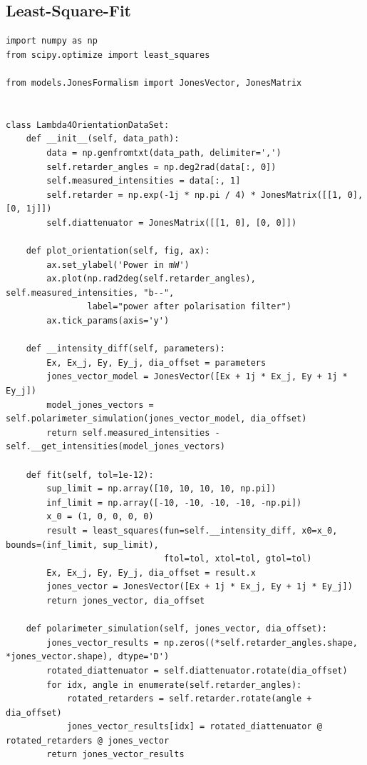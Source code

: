 \documentclass[a4paper, titlepage,  ngerman]{book}
\begin{document}
\subsection{Least-Square-Fit}
\begin{verbatim}
import numpy as np
from scipy.optimize import least_squares

from models.JonesFormalism import JonesVector, JonesMatrix


class Lambda4OrientationDataSet:
    def __init__(self, data_path):
        data = np.genfromtxt(data_path, delimiter=',')
        self.retarder_angles = np.deg2rad(data[:, 0])
        self.measured_intensities = data[:, 1]
        self.retarder = np.exp(-1j * np.pi / 4) * JonesMatrix([[1, 0], [0, 1j]])
        self.diattenuator = JonesMatrix([[1, 0], [0, 0]])

    def plot_orientation(self, fig, ax):
        ax.set_ylabel('Power in mW')
        ax.plot(np.rad2deg(self.retarder_angles), self.measured_intensities, "b--",
                label="power after polarisation filter")
        ax.tick_params(axis='y')

    def __intensity_diff(self, parameters):
        Ex, Ex_j, Ey, Ey_j, dia_offset = parameters
        jones_vector_model = JonesVector([Ex + 1j * Ex_j, Ey + 1j * Ey_j])
        model_jones_vectors = self.polarimeter_simulation(jones_vector_model, dia_offset)
        return self.measured_intensities - self.__get_intensities(model_jones_vectors)

    def fit(self, tol=1e-12):
        sup_limit = np.array([10, 10, 10, 10, np.pi])
        inf_limit = np.array([-10, -10, -10, -10, -np.pi])
        x_0 = (1, 0, 0, 0, 0)
        result = least_squares(fun=self.__intensity_diff, x0=x_0, bounds=(inf_limit, sup_limit),
                               ftol=tol, xtol=tol, gtol=tol)
        Ex, Ex_j, Ey, Ey_j, dia_offset = result.x
        jones_vector = JonesVector([Ex + 1j * Ex_j, Ey + 1j * Ey_j])
        return jones_vector, dia_offset

    def polarimeter_simulation(self, jones_vector, dia_offset):
        jones_vector_results = np.zeros((*self.retarder_angles.shape, *jones_vector.shape), dtype='D')
        rotated_diattenuator = self.diattenuator.rotate(dia_offset)
        for idx, angle in enumerate(self.retarder_angles):
            rotated_retarders = self.retarder.rotate(angle + dia_offset)
            jones_vector_results[idx] = rotated_diattenuator @ rotated_retarders @ jones_vector
        return jones_vector_results



\end{verbatim}
\end{document}
